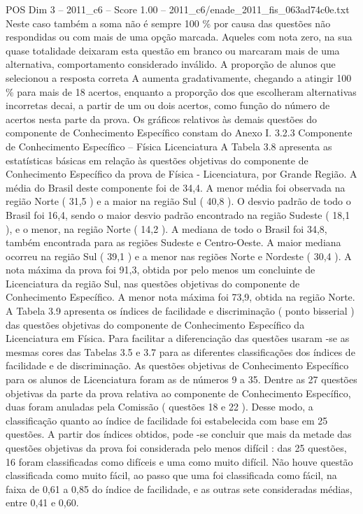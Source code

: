\begin{textsample}{POS Dim 3 – 2011\_c6 – Score 1.00 – 2011\_c6/enade\_2011\_fis\_063ad74c0e.txt}
Neste caso também a soma não é sempre 100 \% por causa das questões não respondidas ou com mais de uma opção marcada.
Aqueles com nota zero, na sua quase totalidade deixaram esta questão em branco ou marcaram mais de uma alternativa, comportamento considerado inválido.
A proporção de alunos que selecionou a resposta correta A aumenta gradativamente, chegando a atingir 100 \% para mais de 18 acertos, enquanto a proporção dos que escolheram alternativas incorretas decai, a partir de um ou dois acertos, como função do número de acertos nesta parte da prova.
Os gráficos relativos às demais questões do componente de Conhecimento Específico constam do Anexo I. 3.2.3 Componente de Conhecimento Específico – Física Licenciatura A Tabela 3.8 apresenta as estatísticas básicas em relação às questões objetivas do componente de Conhecimento Específico da prova de Física - Licenciatura, por Grande Região.
A média do Brasil deste componente foi de 34,4.
A menor média foi observada na região Norte ( 31,5 ) e a maior na região Sul ( 40,8 ).
O desvio padrão de todo o Brasil foi 16,4, sendo o maior desvio padrão encontrado na região Sudeste ( 18,1 ), e o menor, na região Norte ( 14,2 ).
A mediana de todo o Brasil foi 34,8, também encontrada para as regiões Sudeste e Centro-Oeste.
A maior mediana ocorreu na região Sul ( 39,1 ) e a menor nas regiões Norte e Nordeste ( 30,4 ).
A nota máxima da prova foi 91,3, obtida por pelo menos um concluinte de Licenciatura da região Sul, nas questões objetivas do componente de Conhecimento Específico.
A menor nota máxima foi 73,9, obtida na região Norte.
A Tabela 3.9 apresenta os índices de facilidade e discriminação ( ponto bisserial ) das questões objetivas do componente de Conhecimento Específico da Licenciatura em Física.
Para facilitar a diferenciação das questões usaram -se as mesmas cores das Tabelas 3.5 e 3.7 para as diferentes classificações dos índices de facilidade e de discriminação.
As questões objetivas de Conhecimento Específico para os alunos de Licenciatura foram as de números 9 a 35.
Dentre as 27 questões objetivas da parte da prova relativa ao componente de Conhecimento Específico, duas foram anuladas pela Comissão ( questões 18 e 22 ).
Desse modo, a classificação quanto ao índice de facilidade foi estabelecida com base em 25 questões.
A partir dos índices obtidos, pode -se concluir que mais da metade das questões objetivas da prova foi considerada pelo menos difícil : das 25 questões, 16 foram classificadas como difíceis e uma como muito difícil.
Não houve questão classificada como muito fácil, ao passo que uma foi classificada como fácil, na faixa de 0,61 a 0,85 do índice de facilidade, e as outras sete consideradas médias, entre 0,41 e 0,60.

\end{textsample}
